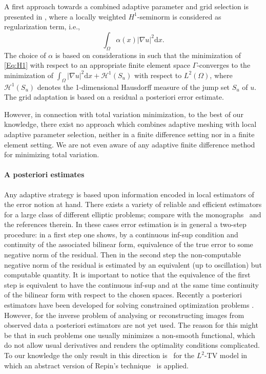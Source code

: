 \documentclass[enabledeprecatedfontcommands,cleardoublepage=empty,headsepline,twoside,11pt,DIV=15,BCOR=12mm,final]{scrartcl}
\begin{document}
A first approach towards a combined adaptive parameter and grid selection is presented in \cite{BelhachmiHecht:15}, where a locally weighted $H^1$-seminorm is considered as regularization term, i.e., 
\begin{equation}\label{Eq:H1}
\int_\Omega \alpha(x)|\nabla u|^2 \text{d}x.
\end{equation}
 The choice of $\alpha$ is based on considerations in \cite{BourdinChambolle:00} such that the minimization of \eqref{Eq:H1} with respect to an appropriate finite element space $\Gamma$-converges to the minimization of $\int_\Omega |\nabla u|^2 \text{d}x + \mathcal{H}^{1}(S_u)$ with respect to $L^2(\Omega)$, %
 where $\mathcal{H}^{1}(S_u)$ denotes the 1-dimensional Hausdorff measure of the jump set $S_u$ of $u$. The grid adaptation is based on a residual a posteriori error estimate.

However, in connection with total variation minimization, to the best of our knowledge, there exist no approach which combines adaptive meshing with local adaptive parameter selection, neither in a finite difference setting nor in a finite element setting. We are not even aware of any adaptive finite difference method for minimizing total variation.

\paragraph{A posteriori estimates}
Any adaptive strategy is based upon information encoded in local estimators of the error notion at hand. There exists a variety of reliable and efficient estimators for a large class of different elliptic problems; compare with the monographs~\cite{AinsworthOden:00,Ciarlet:02,Verfurth:96} and the references therein. In these cases error estimation is in general a two-step procedure: in a first step one shows, by a continuous inf-sup condition and continuity of the associated bilinear form, equivalence of the true error to some negative norm of the residual. Then in the second step the non-computable negative norm of the residual is estimated by an equivalent (up to oscillation) but computable quantity. It is important to notice that the equivalence of the first step is equivalent to have the continuous inf-sup and at the same time continuity of the bilinear form with respect to the chosen spaces. Recently a posteriori estimators have been developed for solving constrained optimization problems \cite{KoRoSi:14}. However, for the inverse problem of analysing or reconstructing images from observed data a posteriori estimators are not yet used. The reason for this might be that in such problems one usually minimizes a non-smooth functional, which do not allow usual derivatives and renders the optimality conditions complicated. To our knowledge the only result in this direction is~\cite{Bartels:15a} for the $L^2$-TV model in which an abstract version of Repin's technique~\cite{Repin:00} is applied.
\end{document}
